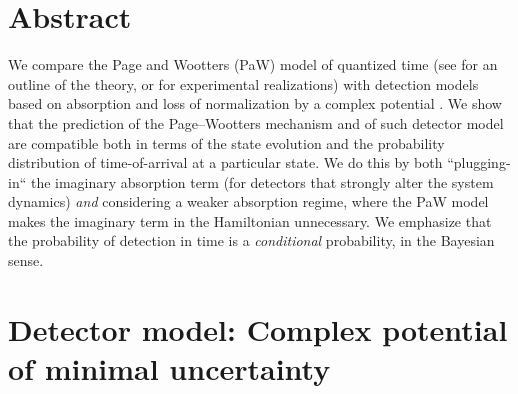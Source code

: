 \documentclass[a0,portrait]{a0poster}
\begin{document}
\begin{multicols}{2} %


\color{Navy} %

\section*{\large Abstract}
We compare the Page and Wootters (PaW) model of quantized time
(see \cite{PageWootters, Lloyd:Time} for an outline of the theory,
or \cite{Moreva:illustration, Moreva_position} for experimental realizations)
with detection models based on absorption and loss of normalization
by a complex potential \cite{RuschhauptAbsorption}. We show that the prediction
of the Page--Wootters mechanism and of such detector model are compatible both in terms
of the state evolution and
the probability distribution of
time-of-arrival at a particular state.
We do this by both ``plugging-in``
the imaginary absorption term (for detectors that strongly alter the system dynamics)
\emph{and} considering a weaker absorption regime, where the PaW model makes
the imaginary term in the Hamiltonian unnecessary. We emphasize that the probability
of detection in time is a \emph{conditional}
probability, in the Bayesian \cite{Maccone:QMOT} sense.



\setlength{\parindent}{1.5em} %


\large

\color{DarkSlateGray} %

\section*{Detector model: Complex potential of minimal uncertainty \cite{RuschhauptAbsorption}}


\end{multicols}
\end{document}
